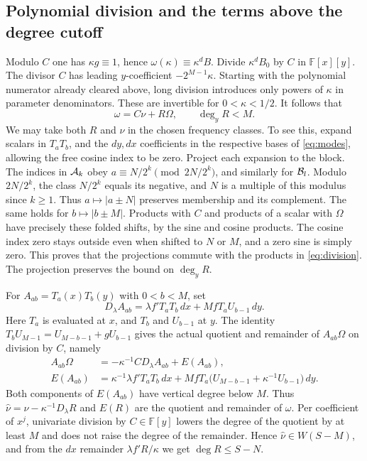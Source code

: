 \subsection{Polynomial division and the terms above the degree cutoff}
Modulo \(C\) one has \(\kappa g\equiv1\), hence \(\omega(\kappa)\equiv\kappa^d B\). Divide \(\kappa^d B_0\) by \(C\) in \(\mathbb F[x][y]\). The divisor \(C\) has leading \(y\)-coefficient \(-2^{M-1}\kappa\). Starting with the polynomial numerator already cleared above, long division introduces only powers of \(\kappa\) in parameter denominators. These are invertible for \(0<\kappa<1/2\). It follows that
\begin{equation}\label{eq:division}
 \omega=C\nu+R\Omega,\qquad \deg_yR<M .
\end{equation}
We may take both $R$ and $\nu$ in the chosen frequency classes. To see this, expand scalars in $T_aT_b$, and the $dy,dx$ coefficients in the respective bases of \eqref{eq:modes}, allowing the free cosine index to be zero. Project each expansion to the block. The indices in $\mathcal A_k$ obey $a\equiv N/2^k\pmod{2N/2^k}$, and similarly for $\mathcal B_l$. Modulo \(2N/2^k\), the class \(N/2^k\) equals its negative, and \(N\) is a multiple of this modulus since \(k\ge1\). Thus \(a\mapsto|a\pm N|\) preserves membership and its complement. The same holds for \(b\mapsto|b\pm M|\). Products with $C$ and products of a scalar with $\Omega$ have precisely these folded shifts, by the sine and cosine products. The cosine index zero stays outside even when shifted to $N$ or $M$, and a zero sine is simply zero. This proves that the projections commute with the products in \eqref{eq:division}. The projection preserves the bound on $\deg_yR$.

For $A_{ab}=T_a(x)T_b(y)$ with $0<b<M$, set
\begin{equation}\label{eq:delta}
 D_\lambda A_{ab}=\lambda f'T_aT_b\,dx + M f T_a U_{b-1}\,dy .
\end{equation}
Here $T_a$ is evaluated at $x$, and $T_b$ and $U_{b-1}$ at $y$. The identity $T_b U_{M-1}=U_{M-b-1}+gU_{b-1}$ gives the actual quotient and remainder of $A_{ab}\Omega$ on division by $C$, namely
\begin{align}
 A_{ab}\Omega &=-\kappa^{-1}C D_\lambda A_{ab} + E(A_{ab}),\nonumber\\
 E(A_{ab})&=\kappa^{-1}\lambda f'T_aT_b\,dx+
 M f T_a\bigl(U_{M-b-1}+\kappa^{-1}U_{b-1}\bigr)\,dy .
 \label{eq:rem}
\end{align}
Both components of $E(A_{ab})$ have vertical degree below $M$. Thus $\widehat\nu=\nu-\kappa^{-1}D_\lambda R$ and $E(R)$ are the quotient and remainder of $\omega$. Per coefficient of $x^j$, univariate division by $C\in\mathbb F[y]$ lowers the degree of the quotient by at least $M$ and does not raise the degree of the remainder. Hence $\widehat\nu\in W(S-M)$, and from the $dx$ remainder $\lambda f'R/\kappa$ we get $\deg R\le S-N$.

